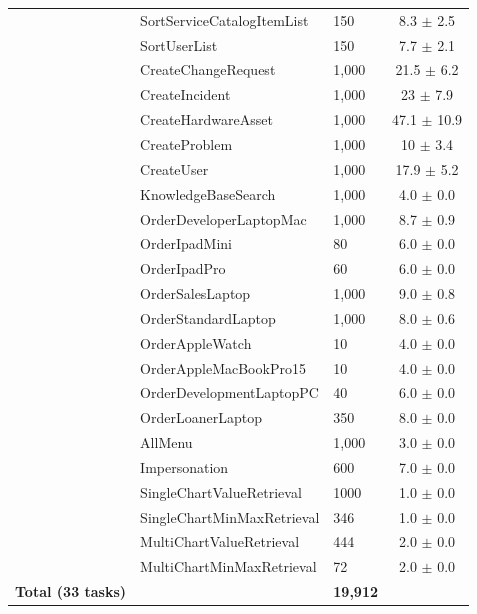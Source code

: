\documentclass{article}
\theoremstyle{plain}
\theoremstyle{definition}
\theoremstyle{remark}
\newcommand{\wainstancecount}{{19,912}}
\begin{document}
\begin{table}[htb]
\begin{tabular}{@{}cMp{1in}c@{}}
        & SortServiceCatalogItemList & 150 & 8.3 $\pm$ 2.5\\
        & SortUserList & 150 & 7.7 $\pm$ 2.1\\
        \midrule
         & CreateChangeRequest & 1,000 & 21.5 $\pm$ 6.2\\
        & CreateIncident & 1,000 & 23 $\pm$ 7.9\\
        & CreateHardwareAsset & 1,000 & 47.1 $\pm$ 10.9\\
        & CreateProblem & 1,000 & 10 $\pm$ 3.4\\
        & CreateUser & 1,000 & 17.9 $\pm$ 5.2\\
        \midrule
         & KnowledgeBaseSearch &  1,000 & 4.0 $\pm$ 0.0\\
        \midrule
         & OrderDeveloperLaptopMac & 1,000 & 8.7 $\pm$ 0.9\\
        & OrderIpadMini & 80 & 6.0 $\pm$ 0.0\\
        & OrderIpadPro & 60 & 6.0 $\pm$ 0.0\\
        & OrderSalesLaptop & 1,000 & 9.0 $\pm$ 0.8\\
        & OrderStandardLaptop & 1,000 & 8.0 $\pm$ 0.6\\
        & OrderAppleWatch & 10 & 4.0 $\pm$ 0.0\\
        & OrderAppleMacBookPro15 & 10 & 4.0 $\pm$ 0.0\\
        & OrderDevelopmentLaptopPC & 40 & 6.0 $\pm$ 0.0\\
        & OrderLoanerLaptop & 350 & 8.0 $\pm$ 0.0\\
        \midrule
         & AllMenu & 1,000 & 3.0 $\pm$ 0.0\\
        & Impersonation & 600 & 7.0 $\pm$ 0.0\\
        \midrule
         & SingleChartValueRetrieval & 1000 & 1.0 $\pm$ 0.0\\
        & SingleChartMinMaxRetrieval & 346 &  1.0 $\pm$ 0.0\\
        & MultiChartValueRetrieval & 444 &  2.0 $\pm$ 0.0\\
        & MultiChartMinMaxRetrieval & 72 &  2.0 $\pm$ 0.0\\
        \midrule
        \textbf{Total (33 tasks)} &   & \textbf{\wainstancecount}\\
        \bottomrule
    \end{tabular}
\end{table}
\end{document}
